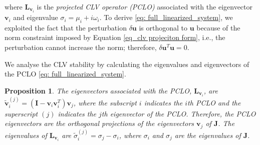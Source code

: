 \documentclass[aps,reprint,prx]{revtex4-2}
\newtheorem{proposition}{Proposition}
\begin{document}
where $\mathbf{L}_{\mathbf{v}_i}$ is the \textit{projected CLV operator (PCLO)} associated with the eigenvector $\mathbf{v}_i$ and eigenvalue ${\sigma_i = \mu_i +i\omega_i}$. To derive \eqref{eq: full_linearized_system}, we exploited the fact that the perturbation $\delta \mathbf{u}$ is orthogonal to $\mathbf{u}$ because of the norm constraint imposed by Equation \eqref{eq_clv projeciton form}, i.e., the perturbation cannot increase the norm; therefore, $\delta \mathbf{u}^T\mathbf{u} = 0$.

We analyse the CLV stability by calculating the eigenvalues and eigenvectors of the PCLO \eqref{eq: full_linearized_system}.

\begin{proposition}
The eigenvectors associated with the PCLO, $\mathbf{L}_{\mathbf{v}_i}$, are $\tilde{\mathbf{v}}_i^{(j)} = \left( \mathbf{I} - \mathbf{v}_i\mathbf{v}_i^T\right)\mathbf{v}_{j}$, where the subscript $i$ indicates the $i$th PCLO and the superscript $(j)$ indicates the $j$th eigenvector of the PCLO. Therefore, the PCLO eigenvectors are the orthogonal projections of the eigenvectors $\mathbf{v}_j$ of $\mathbf{J}$.
The eigenvalues of $\mathbf{L}_{\mathbf{v}_i}$ are $\tilde{\sigma}_i^{(j)} = \sigma_j - \sigma_i$, where $\sigma_i$ and $\sigma_j$ are the eigenvalues of $\mathbf{J}$.
\end{proposition}
\end{document}
